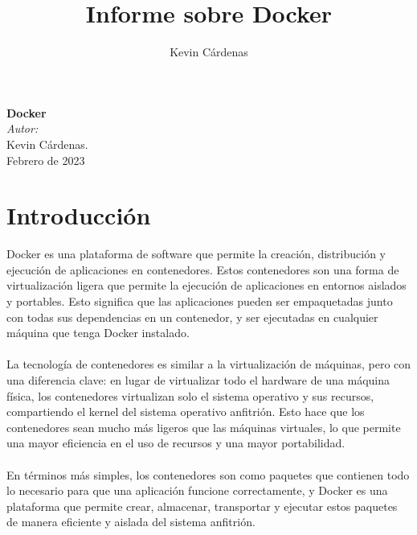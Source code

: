 \documentclass{article}
\title{Informe sobre Docker}
\author{Kevin Cárdenas}
\begin{document}
\begin{titlepage}
    \begin{center}
        {\Huge \textbf{Docker}}
        \\[18cm]

        \large\emph{Autor:}\\
        Kevin Cárdenas.
        \\[1cm]
        {\large Febrero de 2023}
    \end{center}
\end{titlepage}

\newpage
\tableofcontents
\newpage

\section{Introducción}
Docker es una plataforma de software que permite la creación, distribución y ejecución de aplicaciones en contenedores. Estos contenedores son una forma de virtualización ligera que permite la ejecución de aplicaciones en entornos aislados y portables. Esto significa que las aplicaciones pueden ser empaquetadas junto con todas sus dependencias en un contenedor, y ser ejecutadas en cualquier máquina que tenga Docker instalado.
\\
\\
La tecnología de contenedores es similar a la virtualización de máquinas, pero con una diferencia clave: en lugar de virtualizar todo el hardware de una máquina física, los contenedores virtualizan solo el sistema operativo y sus recursos, compartiendo el kernel del sistema operativo anfitrión. Esto hace que los contenedores sean mucho más ligeros que las máquinas virtuales, lo que permite una mayor eficiencia en el uso de recursos y una mayor portabilidad.
\\
\\
En términos más simples, los contenedores son como paquetes que contienen todo lo necesario para que una aplicación funcione correctamente, y Docker es una plataforma que permite crear, almacenar, transportar y ejecutar estos paquetes de manera eficiente y aislada del sistema anfitrión.
\end{document}
